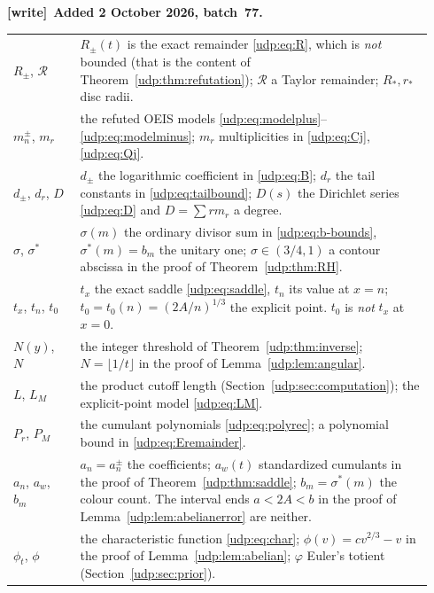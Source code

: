 \documentclass[11pt]{article}
\theoremstyle{remark}\newtheorem{remark}[theorem]{Remark}
\newenvironment{writenote}[1][]{\par\smallskip\begingroup\small
 \noindent\textbf{[write]}\if\relax\detokenize{#1}\relax\else~\textbf{#1.}\fi\ }%
 {\par\endgroup\smallskip}
\numberwithin{equation}{section}
\begin{document}
\begin{writenote}[Added 2 October 2026, batch~77]
\begin{center}
\begin{tabular}{@{}p{0.15\linewidth}p{0.79\linewidth}@{}}
$R_\pm$, $\mathcal R$ & $R_\pm(t)$ is the exact remainder \eqref{udp:eq:R}, which is \emph{not} bounded (that is the content of Theorem~\ref{udp:thm:refutation}); $\mathcal R$ a Taylor remainder; $R_*,r_*$ disc radii.\\
$m_n^\pm$, $m_r$ & the refuted OEIS models \eqref{udp:eq:modelplus}--\eqref{udp:eq:modelminus}; $m_r$ multiplicities in \eqref{udp:eq:Cj}, \eqref{udp:eq:Qj}.\\
$d_\pm$, $d_r$, $D$ & $d_\pm$ the logarithmic coefficient in \eqref{udp:eq:B}; $d_r$ the tail constants in \eqref{udp:eq:tailbound}; $D(s)$ the Dirichlet series \eqref{udp:eq:D} and $D=\sum rm_r$ a degree.\\
$\sigma$, $\sigma^*$ & $\sigma(m)$ the ordinary divisor sum in \eqref{udp:eq:b-bounds}, $\sigma^*(m)=b_m$ the unitary one; $\sigma\in(3/4,1)$ a contour abscissa in the proof of Theorem~\ref{udp:thm:RH}.\\
$t_x$, $t_n$, $t_0$ & $t_x$ the exact saddle \eqref{udp:eq:saddle}, $t_n$ its value at $x=n$; $t_0=t_0(n)=(2A/n)^{1/3}$ the explicit point. $t_0$ is \emph{not} $t_x$ at $x=0$.\\
$N(y)$, $N$ & the integer threshold of Theorem~\ref{udp:thm:inverse}; $N=\lfloor1/t\rfloor$ in the proof of Lemma~\ref{udp:lem:angular}.\\
$L$, $L_M$ & the product cutoff length (Section~\ref{udp:sec:computation}); the explicit-point model \eqref{udp:eq:LM}.\\
$P_r$, $P_M$ & the cumulant polynomials \eqref{udp:eq:polyrec}; a polynomial bound in \eqref{udp:eq:Eremainder}.\\
$a_n$, $a_w$, $b_m$ & $a_n=a_n^\pm$ the coefficients; $a_w(t)$ standardized cumulants in the proof of Theorem~\ref{udp:thm:saddle}; $b_m=\sigma^*(m)$ the colour count. The interval ends $a<2A<b$ in the proof of Lemma~\ref{udp:lem:abelianerror} are neither.\\
$\phi_t$, $\phi$ & the characteristic function \eqref{udp:eq:char}; $\phi(v)=cv^{2/3}-v$ in the proof of Lemma~\ref{udp:lem:abelian}; $\varphi$ Euler's totient (Section~\ref{udp:sec:prior}).\\
\bottomrule
\end{tabular}
\end{center}
\end{writenote}
\end{document}

